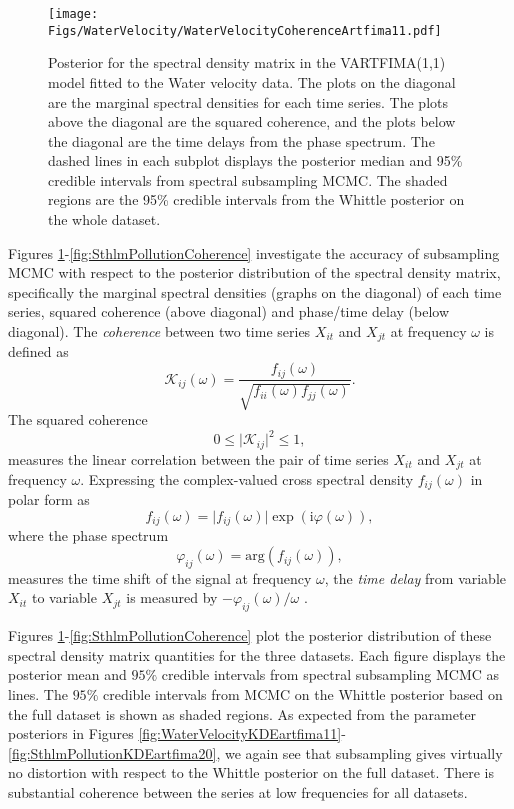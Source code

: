 \documentclass[11pt,english,oneside]{amsart}
\numberwithin{equation}{section}
\theoremstyle{plain}
\numberwithin{equation}{section}
\newcommand{\ci}{\mathrm{i}}
\begin{document}
\begin{figure}
    \texttt{[image: Figs/WaterVelocity/WaterVelocityCoherenceArtfima11.pdf]}
    \caption{Posterior for the spectral density matrix in the VARTFIMA(1,1) model fitted to the Water velocity data. The plots on the diagonal are the marginal spectral densities for each time series. The plots above the diagonal are the squared coherence, and the plots below the diagonal are the time delays from the phase spectrum. The dashed lines in each subplot displays the posterior median and 95\% credible intervals from spectral subsampling MCMC. The shaded regions are the 95\% credible intervals from the Whittle posterior on the whole dataset.}\label{fig:WaterVelocityCoherence}
\end{figure}

Figures \ref{fig:WaterVelocityCoherence}-\ref{fig:SthlmPollutionCoherence} investigate the accuracy of subsampling MCMC with respect to the posterior distribution of the spectral density matrix, specifically the marginal spectral densities (graphs on the diagonal) of each time series, squared coherence (above diagonal) and phase/time delay (below diagonal). The \emph{coherence} between two time series $X_{it}$  and $X_{jt}$ at frequency $\omega$ is defined as
\begin{equation*}
    \mathcal{K}_{ij}(\omega)=
    \frac{f_{ij}(\omega)}{\sqrt{f_{ii}(\omega)f_{jj}(\omega)}}.
\end{equation*}
The squared coherence 
\begin{equation*}
    0\leq \vert \mathcal{K}_{ij} \vert ^2 \leq 1,
\end{equation*}
measures the linear correlation between the pair of time series $X_{it}$ and $X_{jt}$ at frequency $\omega$. Expressing the complex-valued cross spectral density $f_{ij}(\omega)$ in polar form as $$f_{ij}(\omega) =  \vert f_{ij}(\omega) \vert \exp(\ci\varphi(\omega)),$$ where the phase spectrum $$\varphi_{ij}(\omega) = \mathrm{arg}(f_{ij}(\omega)),$$ measures the time shift of the signal at frequency $\omega$, the \emph{time delay} from variable $X_{it}$ to variable $X_{jt}$ is measured by $-\varphi_{ij}(\omega)/\omega$ \citep{wei1990time}.

Figures \ref{fig:WaterVelocityCoherence}-\ref{fig:SthlmPollutionCoherence} plot the posterior distribution of these spectral density matrix quantities for the three datasets. Each figure displays the posterior mean and $95\%$ credible intervals from spectral subsampling MCMC as lines. The $95\%$ credible intervals from MCMC on the Whittle posterior based on the full dataset is shown as shaded regions. As expected from the parameter posteriors in Figures \ref{fig:WaterVelocityKDEartfima11}-\ref{fig:SthlmPollutionKDEartfima20}, we again see that subsampling gives virtually no distortion with respect to the Whittle posterior on the full dataset. There is substantial coherence between the series at low frequencies for all datasets. 
\end{document}
